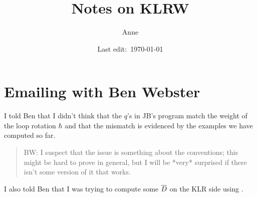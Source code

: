 \documentclass[11pt]{article}
\title{Notes on KLRW} %
\author{Anne}
\date{Last edit:~\today}
\begin{document}
\maketitle
\tableofcontents
% 
\section{Emailing with Ben Webster}
I told Ben that I didn't think that the $q$'s in JB's program match the weight of the loop rotation $\hbar$ and that the mismatch is evidenced by the examples we have computed so far. 

\begin{quotation}
BW: I suspect that the issue is something about the conventions;  this might be hard to prove in general, but I will be *very* surprised if there isn't some version of it that works.
\end{quotation}

I also told Ben that I was trying to compute some $\overline{D}$ on the KLR side using \cite[Lemma 5.17]{kamnitzer2019category}. 
\end{document}
